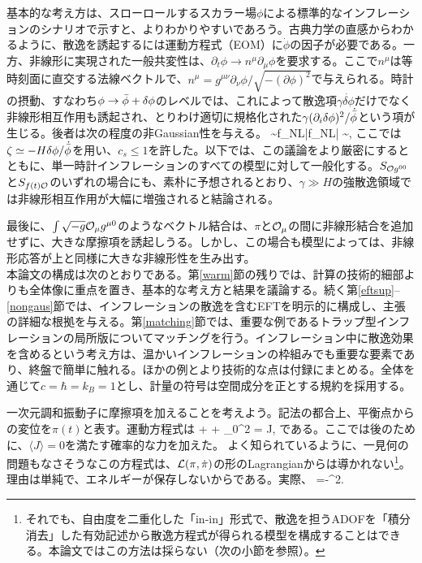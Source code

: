 基本的な考え方は、スローロールするスカラー場$\phi$による標準的なインフレーションのシナリオで示すと、よりわかりやすいであろう。古典力学の直感からわかるように、散逸を誘起するには運動方程式（EOM）に$\dot\phi$の因子が必要である。一方、非線形に実現された一般共変性は、$\partial_t\phi \to n^\mu \partial_\mu \phi$を要求する。ここで$n^\mu$は等時刻面に直交する法線ベクトルで、$n^\mu = g^{\mu\nu}\partial_\nu \phi/\sqrt{-(\partial\phi)^2}$で与えられる。時計の摂動、すなわち$\phi \to {\bar\phi} + \delta\phi$のレベルでは、これによって散逸項$\gamma\dot{\delta\phi}$だけでなく非線形相互作用も誘起され、とりわけ適切に規格化された$\gamma (\partial_i\delta\phi)^2/\dot{{\bar\phi}}$という項が生じる。後者は次の程度の非Gaussian性を与える。
\beq \frac{\gamma}{\dot\bphi} \sim f_{\rm NL}\zeta \quad \to \quad |f_{\rm NL}| \sim {},\eeq
ここでは$\zeta \simeq -H\delta\phi/\dot{{\bar\phi}}$を用い、$c_s \leq 1$を許した。以下では、この議論をより厳密にするとともに、単一時計インフレーションのすべての模型に対して一般化する。$S_{{\cal O} g^{00}}$と$S_{f(t){\cal O}}$のいずれの場合にも、素朴に予想されるとおり、$\gamma \gg H$の強散逸領域では非線形相互作用が大幅に増強されると結論される。

最後に、$\int \sqrt{-g} {\cal O}_\mu g^{\mu0}$のようなベクトル結合は、$\pi$と${\cal O}_\mu$の間に非線形結合を追加せずに、大きな摩擦項を誘起しうる。しかし、この場合も模型によっては、非線形応答が上と同様に大きな非線形性を生み出す。\\

本論文の構成は次のとおりである。第\ref{warm}節の残りでは、計算の技術的細部よりも全体像に重点を置き、基本的な考え方と結果を議論する。続く第\ref{eftsup}--\ref{nongaus}節では、インフレーションの散逸を含むEFTを明示的に構成し、主張の詳細な根拠を与える。第\ref{matching}節では、重要な例であるトラップ型インフレーションの局所版についてマッチングを行う。インフレーション中に散逸効果を含めるという考え方は、温かいインフレーションの枠組み\cite{berera1,berera2,warm}でも重要な要素であり、終盤で簡単に触れる。ほかの例とより技術的な点は付録にまとめる。全体を通じて$c=\hbar=k_B=1$とし、計量の符号は空間成分を正とする規約を採用する。

一次元調和振動子に摩擦項を加えることを考えよう。記法の都合上、平衡点からの変位を$\pi(t)$と表す。運動方程式は
\beq
\label{eom1}
 \ddot \pi + \gamma\dot \pi + \omega_0^2 \pi = J,
\eeq
である。ここでは後のために、$\langle J\rangle=0$を満たす確率的な力を加えた。
よく知られているように、一見何の問題もなさそうなこの方程式は、${\cal L}(\pi,\dot \pi)$の形のLagrangianからは導かれない\footnote{
それでも、自由度を二重化した「in-in」形式で、散逸を担うADOFを「積分消去」した有効記述から散逸方程式が得られる模型を構成することはできる\cite{calzetta,weiss,Zhang}。本論文ではこの方法は採らない（次の小節を参照）。}。理由は単純で、エネルギーが保存しないからである。実際、
\beq
\label{eneloss}
 =-\gamma \dot\pi^2.
\eeq

